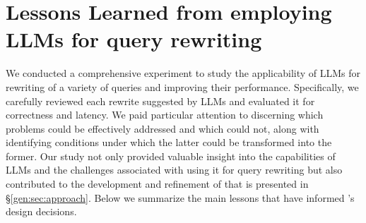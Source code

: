 





\section{Lessons Learned from employing LLMs for query rewriting}
\label{gen:sec:insight}

We conducted a comprehensive experiment to study the applicability of LLMs for  rewriting of a variety of queries  and improving their performance. Specifically, we carefully reviewed each rewrite suggested by LLMs and evaluated it for correctness and latency. We paid particular attention to discerning which problems could be effectively addressed and which could not, along with identifying conditions under which the latter could be transformed into the former.  Our study not only provided valuable insight into the capabilities of LLMs and the challenges associated with using it for query rewriting but also contributed to the development and refinement of \genrewrite that is presented in \S\ref{gen:sec:approach}.
Below we summarize the main lessons that have informed \genrewrite's design decisions. 


